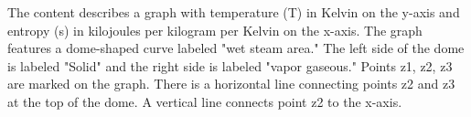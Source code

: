 The content describes a graph with temperature (T) in Kelvin on the y-axis and entropy (s) in kilojoules per kilogram per Kelvin on the x-axis. The graph features a dome-shaped curve labeled "wet steam area." The left side of the dome is labeled "Solid" and the right side is labeled "vapor gaseous." Points z1, z2, z3 are marked on the graph. There is a horizontal line connecting points z2 and z3 at the top of the dome. A vertical line connects point z2 to the x-axis.